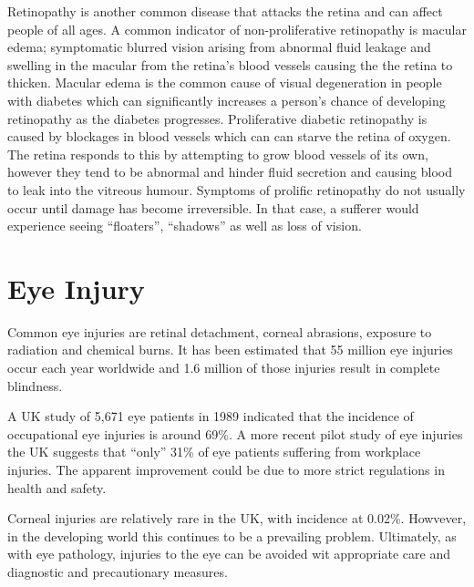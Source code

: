 Retinopathy is another common disease that attacks the retina and 
can affect people of all ages. A common indicator of non-proliferative
retinopathy is macular edema; symptomatic blurred vision arising from
abnormal fluid leakage and swelling in the \gls{macular} from the retina's
blood vessels causing the the retina to thicken.\cite{hee1995quantitative}
Macular edema is the common cause of visual degeneration in people
with diabetes which can significantly increases a person's chance of
developing retinopathy as the diabetes progresses.\cite{klein1984wisconsin}
Proliferative diabetic retinopathy is caused by blockages in blood vessels
which can can starve the retina of oxygen. The retina responds to this by
attempting to grow blood vessels of its own, however they tend to be
abnormal and hinder fluid secretion and causing blood to leak into the 
vitreous humour. Symptoms of prolific retinopathy do not usually occur 
until damage has become irreversible. In that case, a sufferer would
experience seeing \enquote{floaters}, \enquote{shadows} as well as
loss of vision.

\section{Eye Injury}

Common eye injuries are retinal detachment, corneal abrasions, exposure to
radiation and chemical burns. It has been estimated that 55 million eye injuries
occur each year worldwide and 1.6 million of those injuries result in complete
blindness.\cite{negrel1998global}

A UK study of 5,671 eye patients in 1989 indicated that the incidence of
occupational eye injuries is around 69\%.\cite{macewen1989eye} A more
recent pilot study of eye injuries the UK suggests that \enquote{only} 31\%
of eye patients suffering from workplace injuries.\cite{thompson2009occupational}
The apparent improvement could be due to more strict regulations in health
and safety.

Corneal injuries are relatively rare in the UK, with incidence at
0.02\%.\cite{macdonald2009surveillance} Howvever, in the developing
world this continues to be a prevailing problem.\cite{whitcher2001corneal}
Ultimately, as with eye pathology, injuries to the eye can be avoided wit
appropriate care and diagnostic and precautionary measures.



